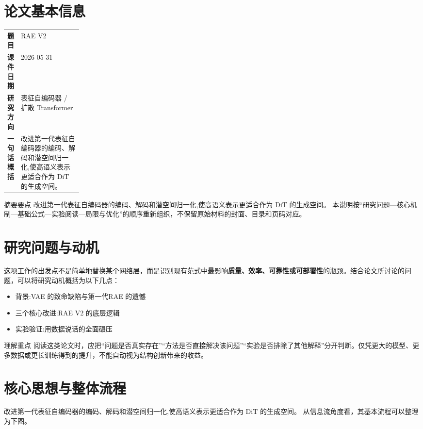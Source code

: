 \documentclass[UTF8,11pt,a4paper]{ctexart}
\newcommand{\term}[1]{\textbf{\textcolor{mainblue}{#1}}}
\begin{document}
\section{论文基本信息}
\begin{center}
\begin{tabularx}{0.94\linewidth}{>{\bfseries}p{0.18\linewidth}X}
\toprule
题目 & RAE V2\\
课件日期 & 2026-05-31\\
研究方向 & 表征自编码器 / 扩散 Transformer\\
一句话概括 & 改进第一代表征自编码器的编码、解码和潜空间归一化,使高语义表示更适合作为 DiT 的生成空间。\\
\bottomrule
\end{tabularx}
\end{center}

\begin{infobox}{摘要要点}
改进第一代表征自编码器的编码、解码和潜空间归一化,使高语义表示更适合作为 DiT 的生成空间。 本说明按“研究问题—核心机制—基础公式—实验阅读—局限与优化”的顺序重新组织，不保留原始材料的封面、目录和页码对应。
\end{infobox}

\section{研究问题与动机}
这项工作的出发点不是简单地替换某个网络层，而是识别现有范式中最影响\term{质量、效率、可靠性或可部署性}的瓶颈。结合论文所讨论的问题，可以将研究动机概括为以下几点：
\begin{itemize}
\item 背景:VAE 的致命缺陷与第一代RAE 的遗憾
\item 三个核心改进:RAE V2 的底层逻辑
\item 实验验证:用数据说话的全面碾压
\end{itemize}

\begin{notebox}{理解重点}
阅读这类论文时，应把“问题是否真实存在”“方法是否直接解决该问题”“实验是否排除了其他解释”分开判断。仅凭更大的模型、更多数据或更长训练得到的提升，不能自动视为结构创新带来的收益。
\end{notebox}

\section{核心思想与整体流程}
改进第一代表征自编码器的编码、解码和潜空间归一化,使高语义表示更适合作为 DiT 的生成空间。 从信息流角度看，其基本流程可以整理为下图。
\end{document}
